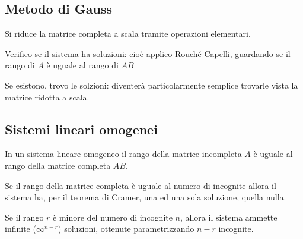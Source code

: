\subsection{Metodo di Gauss}

Si riduce la matrice completa a scala tramite operazioni elementari.

Verifico se il sistema ha soluzioni: cioè applico Rouché-Capelli, guardando se il rango di $A$ è uguale al rango di $AB$

Se esistono, trovo le solzioni: diventerà particolarmente semplice trovarle vista la matrice ridotta a scala.

\subsection{Sistemi lineari omogenei}

\begin{property}
In un sistema lineare omogeneo il rango della matrice incompleta $A$ è uguale al rango della matrice completa $AB$.
\end{property}

\begin{property}
Se il rango della matrice completa è uguale al numero di incognite allora il sistema ha, per il teorema di Cramer, una ed una sola soluzione, quella nulla.
\end{property}

\begin{property}
Se il rango $r$ è minore del numero di incognite $n$, allora il sistema ammette infinite ($\infty^{n-r}$) soluzioni, ottenute parametrizzando $n-r$ incognite.
\end{property}
